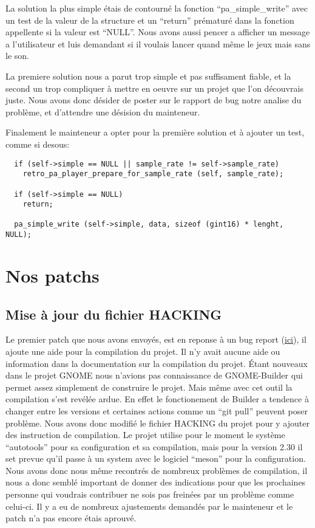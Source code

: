 \documentclass[12pt]{report}
\begin{document}
La solution la plus simple étais de contourné la fonction ``pa\_simple\_write''
avec un test de la valeur de la structure et un ``return'' prématuré dans la fonction
appellente si la valeur est ``NULL''. Nous avons aussi pencer a afficher un message a
l'utilisateur et luis demandant si il voulais lancer quand même le jeux mais sans le son.

La premiere solution nous a parut trop simple et pas suffisament fiable, et la
second un trop compliquer à mettre en oeuvre sur un projet que l'on découvrais juste.
Nous avons donc désider de poster sur le rapport de bug notre analise du problème, et
d'attendre une désision du mainteneur.

Finalement le mainteneur a opter pour la première solution et à ajouter un test, comme
si desous:
\begin{verbatim}
  if (self->simple == NULL || sample_rate != self->sample_rate)
    retro_pa_player_prepare_for_sample_rate (self, sample_rate);

  if (self->simple == NULL)
    return;

  pa_simple_write (self->simple, data, sizeof (gint16) * lenght, NULL);
\end{verbatim}

\section{Nos patchs}
\subsection{Mise à jour du fichier HACKING}
Le premier patch que nous avons envoyés, est en reponse à un bug report
(\href{http://bugzilla.gnome.org/show_bug.cgi?id=788692}{ici}), il ajoute une
aide pour la compilation du projet. \newline
Il n'y avait aucune aide ou information dans la documentation sur la compilation
du projet. Étant nouveaux dans le projet GNOME nous n'avions pas connaissance de 
GNOME-Builder qui permet assez simplement de construire le projet. Mais
même avec cet outil la compilation s'est revélée ardue. En effet 
le fonctionement de Builder a tendence à changer entre les versions et certaines
actions comme un ``git pull'' peuvent poser problème.
Nous avons donc modifié le fichier HACKING du projet pour y ajouter des 
instruction de compilation. \newline
Le projet utilise pour le moment le système ``autotools'' pour sa configuration et 
sa compilation, mais pour la version 2.30 il set prevue qu'il passe à un system
avec le logiciel ``meson'' pour la configuration. \newline
Nous avons donc nous même recontrés de nombreux problèmes de compilation,
il nous a donc semblé important de donner des indications pour que les 
prochaines personne qui voudrais contribuer ne sois pas freinées par un 
problème comme celui-ci.
Il y a eu de nombreux ajustements demandés par le mainteneur et le patch n'a 
pas encore étais aprouvé. \newline
\end{document}
